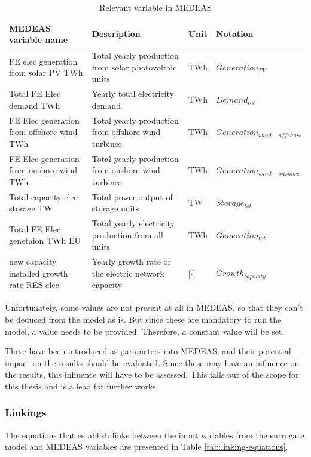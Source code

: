 \begin{table}[h]
    \centering
    \begin{tabular}{|p{5cm}|p{5cm}|p{1cm}|p{4cm}|} \hline 
    MEDEAS variable name &  Description & Unit & Notation \\ \hline
     FE elec generation from solar PV TWh & Total yearly production from solar photovoltaic units & TWh & $Generation_{PV}$\\ \hline 
     Total FE Elec demand TWh & Yearly total electricity demand & TWh & $Demand_{tot}$ \\ \hline 
     FE Elec generation from offshore wind TWh & Total yearly production from offshore wind turbines & TWh & $Generation_{wind-offshore}$ \\ \hline 
     FE Elec generation from onshore wind TWh & Total yearly production from onshore wind turbines & TWh & $Generation_{wind-onshore}$ \\ \hline 
     Total capacity elec storage TW & Total power output of storage units & TW & $Storage_{tot}$ \\ \hline 
     Total FE Elec genetaion TWh EU & Total yearly electricity production from all units & TWh & $Generation_{tot}$ \\ \hline 
     new capacity installed growth rate RES elec & Yearly growth rate of the electric network capacity & [$\cdot$] & $Growth_{capacity}$ \\ \hline
    \end{tabular}
    \caption{Relevant variable in MEDEAS}
    \label{tab:medeas-vars}
\end{table}

Unfortunately, some values are not present at all in MEDEAS, so that they can't be deduced from the model as is. But since these are mandatory to run the model, a value needs to be provided. Therefore, a constant value will be set.

These have been introduced as parameters into MEDEAS, and their potential impact on the results should be evaluated. Since these may have an influence on the results, this influence will have to be assessed. This falls out of the scope for this thesis and is a lead for further works.

\subsubsection{Linkings}

The equations that establish links between the input variables from the surrogate model and MEDEAS variables are presented in Table \ref{tab:linking-equations}.

